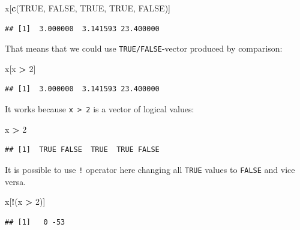 \documentclass[
]{book}
\newenvironment{Shaded}{\begin{snugshade}}{\end{snugshade}}
\newcommand{\DecValTok}[1]{\textcolor[rgb]{0.00,0.00,0.81}{#1}}
\newcommand{\KeywordTok}[1]{\textcolor[rgb]{0.13,0.29,0.53}{\textbf{#1}}}
\newcommand{\NormalTok}[1]{#1}
\newcommand{\OperatorTok}[1]{\textcolor[rgb]{0.81,0.36,0.00}{\textbf{#1}}}
\newcommand{\OtherTok}[1]{\textcolor[rgb]{0.56,0.35,0.01}{#1}}
\newcommand{\StringTok}[1]{\textcolor[rgb]{0.31,0.60,0.02}{#1}}
\begin{document}
\begin{Shaded}
\begin{Highlighting}[]
\NormalTok{x[}\KeywordTok{c}\NormalTok{(}\OtherTok{TRUE}\NormalTok{, }\OtherTok{FALSE}\NormalTok{, }\OtherTok{TRUE}\NormalTok{, }\OtherTok{TRUE}\NormalTok{, }\OtherTok{FALSE}\NormalTok{)]}
\end{Highlighting}
\end{Shaded}

\begin{verbatim}
## [1]  3.000000  3.141593 23.400000
\end{verbatim}

That means that we could use \texttt{TRUE/FALSE}-vector produced by comparison:

\begin{Shaded}
\begin{Highlighting}[]
\NormalTok{x[x }\OperatorTok{>}\StringTok{ }\DecValTok{2}\NormalTok{]}
\end{Highlighting}
\end{Shaded}

\begin{verbatim}
## [1]  3.000000  3.141593 23.400000
\end{verbatim}

It works because \texttt{x\ \textgreater{}\ 2} is a vector of logical values:

\begin{Shaded}
\begin{Highlighting}[]
\NormalTok{x }\OperatorTok{>}\StringTok{ }\DecValTok{2}
\end{Highlighting}
\end{Shaded}

\begin{verbatim}
## [1]  TRUE FALSE  TRUE  TRUE FALSE
\end{verbatim}

It is possible to use \texttt{!} operator here changing all \texttt{TRUE} values to \texttt{FALSE} and vice versa.

\begin{Shaded}
\begin{Highlighting}[]
\NormalTok{x[}\OperatorTok{!}\NormalTok{(x }\OperatorTok{>}\StringTok{ }\DecValTok{2}\NormalTok{)]}
\end{Highlighting}
\end{Shaded}

\begin{verbatim}
## [1]   0 -53
\end{verbatim}
\end{document}
